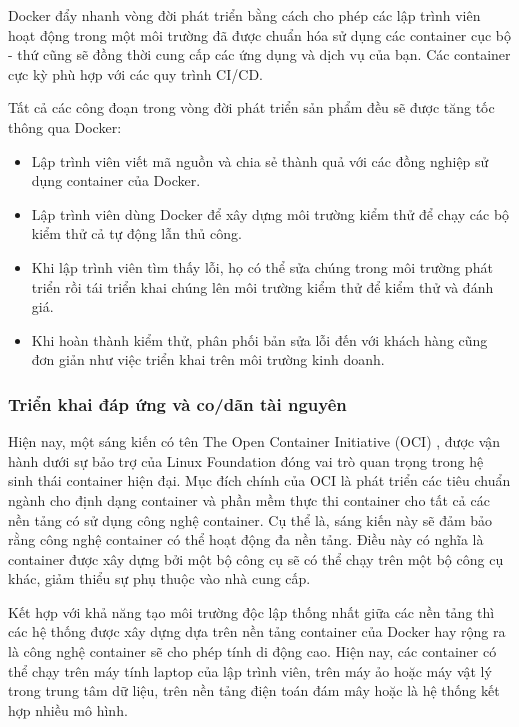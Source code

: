 Docker đẩy nhanh vòng đời phát triển bằng cách cho phép các lập trình viên hoạt động trong một môi trường đã được chuẩn hóa sử dụng các container cục bộ - thứ cũng sẽ đồng thời cung cấp các ứng dụng và dịch vụ của bạn. Các container cực kỳ phù hợp với các quy trình CI/CD.

Tất cả các công đoạn trong vòng đời phát triển sản phẩm đều sẽ được tăng tốc thông qua Docker:
\begin{itemize}
    \item Lập trình viên viết mã nguồn và chia sẻ thành quả với các đồng nghiệp sử dụng container của Docker.
    \item Lập trình viên dùng Docker để xây dựng môi trường kiểm thử để chạy các bộ kiểm thử cả tự động lẫn thủ công.
    \item Khi lập trình viên tìm thấy lỗi, họ có thể sửa chúng trong môi trường phát triển rồi tái triển khai chúng lên môi trường kiểm thử để kiểm thử và đánh giá.
    \item Khi hoàn thành kiểm thử, phân phối bản sửa lỗi đến với khách hàng cũng đơn giản như việc triển khai trên môi trường kinh doanh.
\end{itemize}

\subsubsection{Triển khai đáp ứng và co/dãn tài nguyên}

Hiện nay, một sáng kiến có tên The Open Container Initiative (OCI) \autocite{opencontainerinitiative}, được vận hành dưới sự bảo trợ của Linux Foundation \autocite{linuxfoundation} %
đóng vai trò quan trọng trong hệ sinh thái container hiện đại. Mục đích chính của OCI là phát triển các tiêu chuẩn ngành cho định dạng container và phần mềm thực thi container cho tất cả các nền tảng có sử dụng công nghệ container. Cụ thể là, sáng kiến này sẽ đảm bảo rằng công nghệ container có thể hoạt động đa nền tảng. Điều này có nghĩa là container được xây dựng bởi một bộ công cụ sẽ có thể chạy trên một bộ công cụ khác, giảm thiểu sự phụ thuộc vào nhà cung cấp.

Kết hợp với khả năng tạo môi trường độc lập thống nhất giữa các nền tảng thì các hệ thống được xây dựng dựa trên nền tảng container của Docker hay rộng ra là công nghệ container sẽ cho phép tính di động cao. Hiện nay, các container có thể chạy trên máy tính laptop của lập trình viên, trên máy ảo hoặc máy vật lý trong trung tâm dữ liệu, trên nền tảng điện toán đám mây hoặc là hệ thống kết hợp nhiều mô hình.

